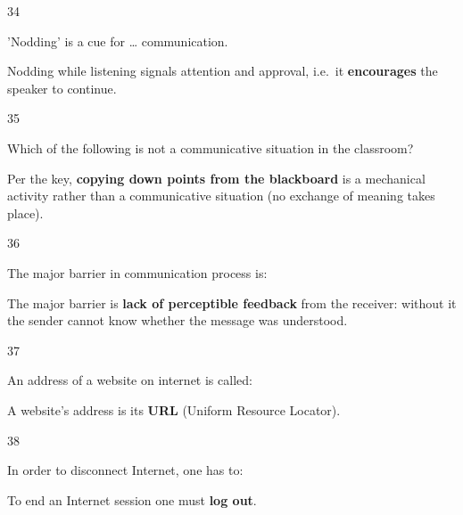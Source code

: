 \begin{question}{34}
{'Nodding' is a cue for \ldots{} communication.\par}
\begin{explain}
Nodding while listening signals attention and approval, i.e.\ it \textbf{encourages} the speaker to continue.
\end{explain}
\end{question}

\begin{question}{35}
{Which of the following is not a communicative situation in the classroom?\par}
\begin{explain}
Per the key, \textbf{copying down points from the blackboard} is a mechanical activity rather than a communicative situation (no exchange of meaning takes place).
\end{explain}
\end{question}

\begin{question}{36}
{The major barrier in communication process is:\par}
\begin{explain}
The major barrier is \textbf{lack of perceptible feedback} from the receiver: without it the sender cannot know whether the message was understood.
\end{explain}
\end{question}

\begin{question}{37}
{An address of a website on internet is called:\par}
\begin{explain}
A website's address is its \textbf{URL} (Uniform Resource Locator).
\end{explain}
\end{question}

\begin{question}{38}
{In order to disconnect Internet, one has to:\par}
\begin{explain}
To end an Internet session one must \textbf{log out}.
\end{explain}
\end{question}

